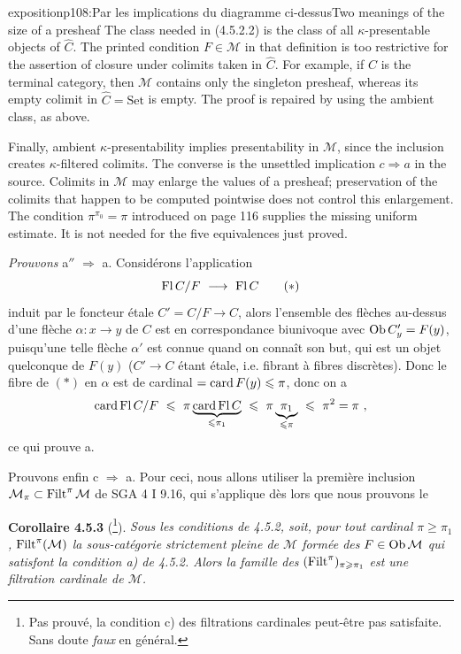 \begin{dcomment}{exposition}{p108:Par les implications du diagramme ci-dessus}{Two meanings of the size of a presheaf}
The class needed in (4.5.2.2) is the class of all $\kappa$-presentable objects of $\widehat C$. The printed condition $F\in\mathcal M$ in that definition is too restrictive for the assertion of closure under colimits taken in $\widehat C$. For example, if $C$ is the terminal category, then $\mathcal M$ contains only the singleton presheaf, whereas its empty colimit in $\widehat C=\mathrm{Set}$ is empty. The proof is repaired by using the ambient class, as above.

Finally, ambient $\kappa$-presentability implies presentability in $\mathcal M$, since the inclusion creates $\kappa$-filtered colimits. The converse is the unsettled implication $c\Rightarrow a$ in the source. Colimits in $\mathcal M$ may enlarge the values of a presheaf; preservation of the colimits that happen to be computed pointwise does not control this enlargement. The condition $\pi^{\pi_0}=\pi$ introduced on page 116 supplies the missing uniform estimate. It is not needed for the five equivalences just proved.
\end{dcomment}



\textit{Prouvons} a$''$ $\Longrightarrow$ a. Considérons l'application
\[
\Fl C/F \ \longrightarrow\ \Fl C
\tag*{$(*)$}
\]
induit par le foncteur étale $C' = C/F \longrightarrow C$, alors l'ensemble des flèches au-dessus d'une %
flèche $\alpha : x \longrightarrow y$ de $C$ est en correspondance biunivoque avec $\mathrm{Ob}\, C'_y = F(y)$, puisqu'une telle flèche $\alpha'$ est connue quand on connaît son but, qui est un objet quelconque de $F(y)$ ($C' \longrightarrow C$ étant étale, i.e. fibrant à fibres discrètes). Donc le fibre de $(*)$ en $\alpha$ est de %
cardinal $= \operatorname{card} F(y) \leqslant \pi$, donc on a
\[
\card\Fl C/F \ \leqslant\ \pi \underbrace{\card\Fl C}_{\leqslant \pi_1} \ \leqslant\ \pi \underbrace{\ \pi_1\ }_{\leqslant \pi} \ \leqslant\ \pi^2 = \pi\ ,
\]
ce qui prouve a.

Prouvons enfin c $\Longrightarrow$ a. Pour ceci, nous allons utiliser la première inclusion $\mathcal{M}_{\pi} \subset \operatorname{Filt}^{\pi}\mathcal{M}$ de SGA 4 I 9.16, qui s'applique dès lors que nous prouvons le

\textbf{Corollaire 4.5.3} (\footnote{Pas prouvé, la condition c) des filtrations cardinales peut-être pas satisfaite. Sans doute \textit{faux} en général.}). \textit{Sous les conditions de 4.5.2, soit, pour tout cardinal $\pi \geqslant \pi_1$,} $\operatorname{Filt}^{\pi}(\mathcal{M})$ \textit{la sous-catégorie strictement pleine de $\mathcal{M}$ formée des $F \in \mathrm{Ob}\,\mathcal{M}$ qui satisfont la condition a) de 4.5.2. Alors la famille des} $(\operatorname{Filt}^{\pi})_{\pi\geqslant\pi_1}$ \textit{est une}
\textit{filtration cardinale de $\mathcal{M}$.}

